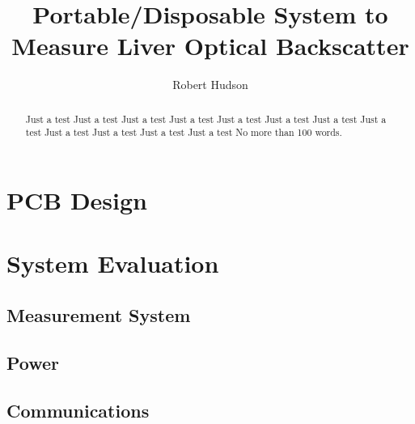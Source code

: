 \documentclass{IIBproject}
\begin{document}
\author{Robert Hudson}
\title{Portable/Disposable System to Measure Liver Optical Backscatter}
\maketitle
\thispagestyle{empty}



\begin{abstract}
Just a test Just a test Just a test Just a test Just a test Just a test 
Just a test Just a test Just a test Just a test Just a test Just a test 
No more than 100 words.
\end{abstract}

\newpage
\tableofcontents
\newpage
\pagestyle{plain}

























%


\section{PCB Design}


%


\section{System Evaluation}
\subsection{Measurement System}
\subsection{Power}
\subsection{Communications}
\end{document}
